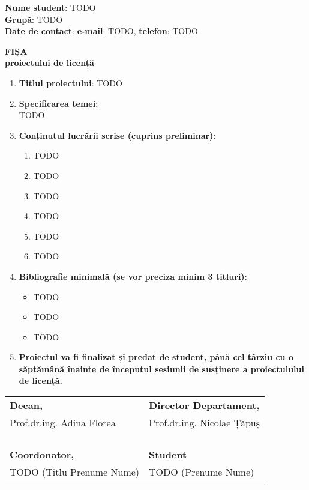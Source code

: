 \documentclass[12pt]{cse-form}
\begin{document}
\textbf{Nume student}: TODO \\
\textbf{Grupă}: TODO \\
\textbf{Date de contact}: \textbf{e-mail}: TODO, \textbf{telefon}: TODO

\vspace{7mm}

\begin{center}
  \large{\textbf{FIȘA\\
  proiectului de licență}}
\end{center}

\vspace{7mm}

\begin{enumerate}
  \item \textbf{Titlul proiectului}: TODO
  \item \textbf{Specificarea temei}:\\
    TODO
  \item \textbf{Conținutul lucrării scrise (cuprins preliminar)}:
    \begin{enumerate}
      \item TODO
      \item TODO
      \item TODO
      \item TODO
      \item TODO
      \item TODO
    \end{enumerate}
  \item \textbf{Bibliografie minimală (se vor preciza minim 3 titluri)}:
    \begin{itemize}
      \item TODO
      \item TODO
      \item TODO
    \end{itemize}
  \item \textbf{Proiectul va fi finalizat și predat de student, până cel
      târziu cu o săptămână înainte de începutul sesiunii de susținere a
    proiectulului de licență.}
\end{enumerate}

\vspace{10mm}

\begin{center}
  \begin{tabular}{@{}p{}p{}@{}}
    \textbf{Decan,} & \textbf{Director Departament,} \\
    Prof.dr.ing. Adina Florea & Prof.dr.ing. Nicolae Țăpuș \\
    & \\
    & \\
    & \\
    & \\
    \textbf{Coordonator,} & \textbf{Student} \\
    TODO (Titlu Prenume Nume) & TODO (Prenume Nume) \\
    & \\
  \end{tabular}
\end{center}
\end{document}
